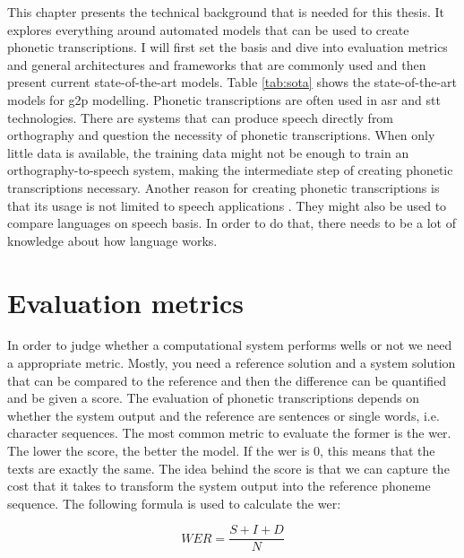 \label{chap:tech-background}
This chapter presents the technical background that is needed for this thesis. It explores everything around automated models that can be used to create phonetic transcriptions. I will first set the basis and dive into evaluation metrics and general architectures and frameworks that are commonly used and then present current state-of-the-art models. Table \ref{tab:sota} shows the state-of-the-art models for \ac{g2p} modelling. Phonetic transcriptions are often used in \ac{asr} and \ac{stt} technologies. There are systems that can produce speech directly from orthography and question the necessity of phonetic transcriptions. When only  little data is available, the training data might not be enough to train an orthography-to-speech system, making the intermediate step of creating phonetic transcriptions necessary. Another reason for creating phonetic transcriptions is that its usage is not limited to speech applications \citep{mortensen-etal-2018-epitran}. They might also be used to compare languages on speech basis. In order to do that, there needs to be a lot of knowledge about how language works. 

\section{Evaluation metrics}
In order to judge whether a computational system performs wells or not we need a appropriate metric. Mostly, you need a reference solution and a system solution that can be compared to the reference and then the difference can be quantified and be given a score. The evaluation of phonetic transcriptions depends on whether the system output and the reference are sentences or single words, i.e. character sequences. The most common metric to evaluate the former is the \ac{wer}. The lower the score, the better the model. If the \ac{wer} is 0, this means that the texts are exactly the same. The idea behind the score is that we can capture the cost that it takes to transform the system output into the reference phoneme sequence. The following formula is used to calculate the \ac{wer}:    

\begin{equation}
\label{eq:wer}
WER = \frac{S+I+D}{N}
\end{equation} 


